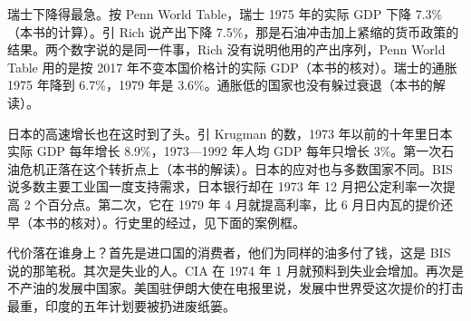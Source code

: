 瑞士下降得最急。按 Penn World Table，瑞士 1975 年的实际 GDP 下降 7.3\%（本书的计算）\cite{pwt1001}。引 Rich 说产出下降 7.5\%，那是石油冲击加上紧缩的货币政策的结果\cite{rich2003}。两个数字说的是同一件事，Rich 没有说明他用的产出序列，Penn World Table 用的是按 2017 年不变本国价格计的实际 GDP（本书的核对）。瑞士的通胀 1975 年降到 6.7\%，1979 年是 3.6\%\cite{wdi47}。通胀低的国家也没有躲过衰退（本书的解读）。

日本的高速增长也在这时到了头。引 Krugman 的数，1973 年以前的十年里日本实际 GDP 每年增长 8.9\%，1973—1992 年人均 GDP 每年只增长 3\%。第一次石油危机正落在这个转折点上（本书的解读）。日本的应对也与多数国家不同。BIS 说多数主要工业国一度支持需求，日本银行却在 1973 年 12 月把公定利率一次提高 2 个百分点\cite{bis1980,boj1986}。第二次，它在 1979 年 4 月就提高利率，比 6 月日内瓦的提价还早（本书的核对）\cite{boj1986}。行史里的经过，见下面的案例框。

代价落在谁身上？首先是进口国的消费者，他们为同样的油多付了钱，这是 BIS 说的那笔税\cite{bis1980}。其次是失业的人。CIA 在 1974 年 1 月就预料到失业会增加\cite{frus47}。再次是不产油的发展中国家。美国驻伊朗大使在电报里说，发展中世界受这次提价的打击最重，印度的五年计划要被扔进废纸篓\cite{frus47}。

